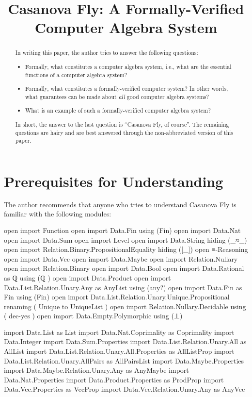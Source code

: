 \documentclass{report}
\title{Casanova Fly: A Formally-Verified Computer Algebra System}
\begin{document}
\maketitle{}

\begin{abstract}
In writing this paper, the author tries to answer the following questions:

\begin{itemize}
  \item Formally, what constitutes a computer algebra system, i.e., what are the essential functions of a computer algebra system?
  \item Formally, what constitutes a formally-verified computer system?  In other words, what guarantees can be made about \emph{all} good computer algebra systems?
  \item What is an example of such a formally-verified computer algebra system?
\end{itemize}

In short, the answer to the last question is ``Casanova Fly, of course''.  The remaining questions are hairy and are best answered through the non-abbreviated version of this paper.
\end{abstract}

\chapter{Prerequisites for Understanding}
The author recommends that anyone who tries to understand Casanova Fly is familiar with the following modules:

\begin{code}
open import Function
open import Data.Fin using (Fin)
open import Data.Nat
open import Data.Sum
open import Level
open import Data.String hiding (_≈_)
open import Relation.Binary.PropositionalEquality hiding ([_])
open ≡-Reasoning
open import Data.Vec
open import Data.Maybe
open import Relation.Nullary
open import Relation.Binary
open import Data.Bool
open import Data.Rational
  as ℚ
  using (ℚ
        )
open import Data.Product
open import Data.List.Relation.Unary.Any as AnyList using (any?)
open import Data.Fin as Fin using (Fin)
open import Data.List.Relation.Unary.Unique.Propositional
  renaming
    ( Unique to UniqueList
    )
open import Relation.Nullary.Decidable
  using
    ( dec-yes
    )
open import Data.Empty.Polymorphic using (⊥)

import Data.List as List
import Data.Nat.Coprimality as Coprimality
import Data.Integer
import Data.Sum.Properties
import Data.List.Relation.Unary.All as AllList
import Data.List.Relation.Unary.All.Properties as AllListProp
import Data.List.Relation.Unary.AllPairs as AllPairsList
import Data.Maybe.Properties
import Data.Maybe.Relation.Unary.Any as AnyMaybe
import Data.Nat.Properties
import Data.Product.Properties as ProdProp
import Data.Vec.Properties as VecProp
import Data.Vec.Relation.Unary.Any as AnyVec
\end{code}
\end{document}
